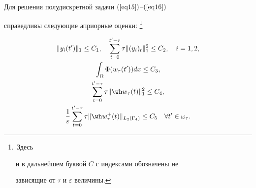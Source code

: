 \begin{lem}


\label{l2}


Для решения полудискретной задачи $(\ref{eq15})$--$(\ref{eq16})$


справедливы следующие априорные оценки$:$\,\footnote{\,Здесь


и в дальнейшем буквой $C$ с индексами обозначены не 


зависящие от $\tau$ и $\varepsilon$ величины.}


\begin{gather}


\| y_{i}(t') \|_{1} \leq C_1 


, \quad \sum_{t=0}^{t'- \tau}


 \tau \| (y_{i})_{t} \|_{1}^{2} 


\leq C_2, \quad i=1,2, \label{eq17} \\


%


\int_{\Omega} \Phi (w_{\tau}(t')) dx \leq C_3, \label{eq18} \\


%


\sum_{t=0}^{t'- \tau} \tau \| \wh w_{\tau}(t) \|_{1}^{2} 


\leq C_4, \label{eq19} \\


%


\frac{1}{\varepsilon} \sum_{t=0}^{t'- \tau} \tau \|


\wh w_{\tau}^{+}(t) \|_{L_{2}(\Gamma_{4})} 


\leq C_5 \quad \forall t' \in \omega_{\tau}.


\label{eq20}


\end{gather}


\end{lem}





